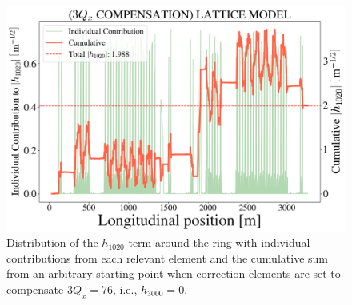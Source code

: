 \begin{figure}[H]
    \centering
    \includegraphics[width=\columnwidth]{chapter4/h1020_3qxcomp.png}
    \caption{Distribution of the $h_{1020}$ term around the ring with individual contributions from each relevant element and the cumulative sum from an arbitrary starting point when correction elements are set to compensate $3Q_x=76$, i.e., $h_{3000}=0$.}
    \label{fig:h1020_3qxcomp}
\end{figure}

